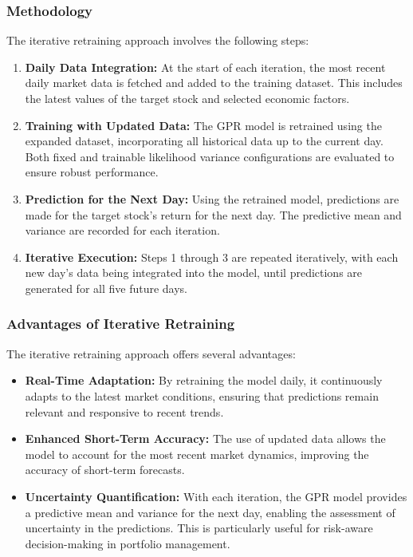 \subsubsection{Methodology}

The iterative retraining approach involves the following steps:

\begin{enumerate}
    \item \textbf{Daily Data Integration:} At the start of each iteration, the most recent daily market data is fetched and added to the training dataset. This includes the latest values of the target stock and selected economic factors.
    \item \textbf{Training with Updated Data:} The GPR model is retrained using the expanded dataset, incorporating all historical data up to the current day. Both fixed and trainable likelihood variance configurations are evaluated to ensure robust performance.
    \item \textbf{Prediction for the Next Day:} Using the retrained model, predictions are made for the target stock's return for the next day. The predictive mean and variance are recorded for each iteration.
    \item \textbf{Iterative Execution:} Steps 1 through 3 are repeated iteratively, with each new day’s data being integrated into the model, until predictions are generated for all five future days.
\end{enumerate}

\subsubsection{Advantages of Iterative Retraining}

The iterative retraining approach offers several advantages:

\begin{itemize}
    \item \textbf{Real-Time Adaptation:} By retraining the model daily, it continuously adapts to the latest market conditions, ensuring that predictions remain relevant and responsive to recent trends.
    \item \textbf{Enhanced Short-Term Accuracy:} The use of updated data allows the model to account for the most recent market dynamics, improving the accuracy of short-term forecasts.
    \item \textbf{Uncertainty Quantification:} With each iteration, the GPR model provides a predictive mean and variance for the next day, enabling the assessment of uncertainty in the predictions. This is particularly useful for risk-aware decision-making in portfolio management.
\end{itemize}

